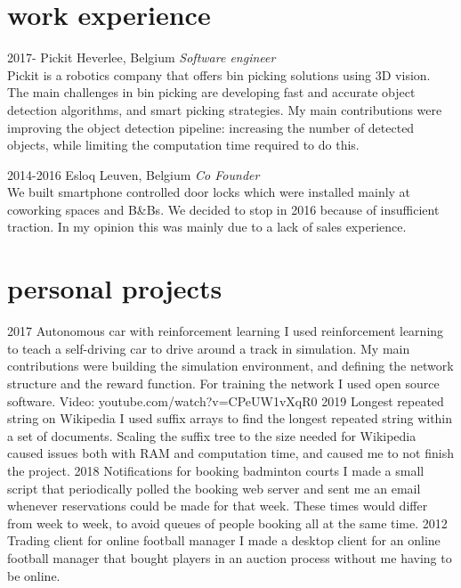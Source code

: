 \documentclass[]{twentysecondcv}
\begin{document}
\section{work experience}
\begin{twenty}
  \twentyitem
    {2017-}
    {Pickit}
    {Heverlee, Belgium}
    {\textit{Software engineer}\\Pickit is a robotics company that offers bin picking solutions using 3D vision. The main challenges in bin picking are developing fast and accurate object detection algorithms, and smart picking strategies. My main contributions were improving the object detection pipeline: increasing the number of detected objects, while limiting the computation time required to do this.}

  \twentyitem
    {2014-2016}
    {Esloq}
    {Leuven, Belgium}
    {\textit{Co Founder}\\We built smartphone controlled door locks which were installed mainly at coworking spaces and B\&Bs. We decided to stop in 2016 because of insufficient traction. In my opinion this was mainly due to a lack of sales experience.}
\end{twenty}

\section{personal projects}
\begin{twenty}
  \twentyitem
    {2017}
    {Autonomous car with reinforcement learning}
    {}
    {I used reinforcement learning to teach a self-driving car to drive around a track in simulation. My main contributions were building the simulation environment, and defining the network structure and the reward function. For training the network I used open source software. Video: youtube.com/watch?v=CPeUW1vXqR0}
  \twentyitem
    {2019}
    {Longest repeated string on Wikipedia}
    {}
    {I used suffix arrays to find the longest repeated string within a set of documents. Scaling the suffix tree to the size needed for Wikipedia caused issues both with RAM and computation time, and caused me to not finish the project.}
  \twentyitem
    {2018}
    {Notifications for booking badminton courts}
    {}
    {I made a small script that periodically polled the booking web server and sent me an email whenever reservations could be made for that week. These times would differ from week to week, to avoid queues of people booking all at the same time.}
  \twentyitem
    {2012}
    {Trading client for online football manager}
    {}
    {I made a desktop client for an online football manager that bought players in an auction process without me having to be online.}
\end{twenty}
\end{document}
